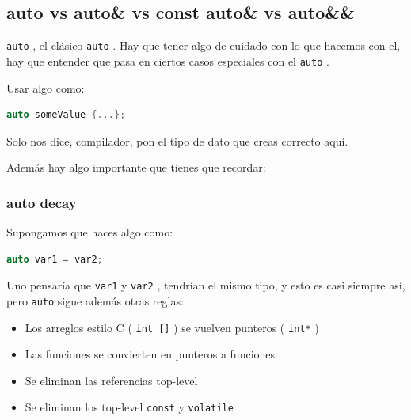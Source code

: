 \documentclass[12pt, fleqn]{report}                             %
\theoremstyle{break}                                            %
\newcommand{\textCode}[1]  { \texttt{#1} }                      %
\begin{document}
            \clearpage
            \subsection{auto vs auto\& vs const auto\& vs auto\&\&} 

                \textCode{auto}, el clásico \textCode{auto}. Hay que tener algo de cuidado con lo que hacemos
                con el, hay que entender que pasa en ciertos casos especiales con el \textCode{auto}.

                Usar algo como:
                \begin{lstlisting}[language=C++, gobble=20]
                    auto someValue {...};
                \end{lstlisting}

                Solo nos dice, compilador, pon el tipo de dato que creas correcto aquí.
                
                Además hay algo importante que tienes que recordar:

                \subsubsection{auto decay} 

                    Supongamos que haces algo como:
                    \begin{lstlisting}[language=C++, gobble=24]
                        auto var1 = var2;
                    \end{lstlisting}

                    Uno pensaría que \textCode{var1} y \textCode{var2}, tendrían el mismo tipo, y esto es casi siempre
                    así, pero \textCode{auto} sigue además otras reglas:
                    
                    \begin{itemize}
                        \item Los arreglos estilo C (\textCode{int []}) se vuelven punteros (\textCode{int*})
                        \item Las funciones se convierten en punteros a funciones
                        \item Se eliminan las referencias top-level
                        \item Se eliminan los top-level \textCode{const} y  \textCode{volatile}
                    \end{itemize}
\end{document}
